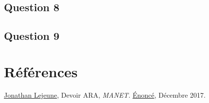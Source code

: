 \documentclass[10pt]{report}
\begin{document}
\subsection{Question 8}
\subsection{Question 9}
\newpage
\section*{Références}
\href{https://pages.lip6.fr/Jonathan.Lejeune/}{Jonathan Lejeune}, Devoir ARA, \textit{MANET.} \href{https://pages.lip6.fr/Jonathan.Lejeune/documents/enseignements/ARA/sujet\_devoir\_2017\_2018.pdf}{Énoncé}, Décembre 2017.
\newline
\newline
\end{document}
